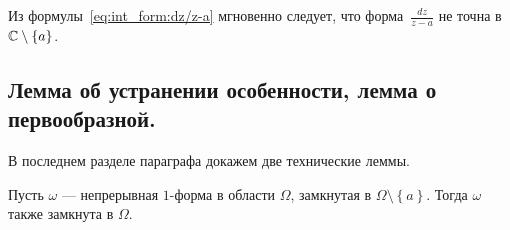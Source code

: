 \documentclass[../complex-analysis.tex]{subfiles}
\begin{document}
Из формулы~\eqref{eq:int_form:dz/z-a} мгновенно следует, что форма~$ \frac{dz}{z-a} $ не точна в $ \mathbb{C} \setminus \left\{ a \right\} $.

\subsection{Лемма об устранении особенности, лемма о первообразной.}

В последнем разделе параграфа докажем две технические леммы.

\begin{lm}
 \label{lemma:ob_ustranenii_osobennosti}
 Пусть $\omega$ --- непрерывная $1$-форма в области $\Omega$, замкнутая в $ \Omega \setminus \left\{ a \right\} $. Тогда $\omega$ также замкнута в $\Omega$.
\end{lm}
\end{document}
